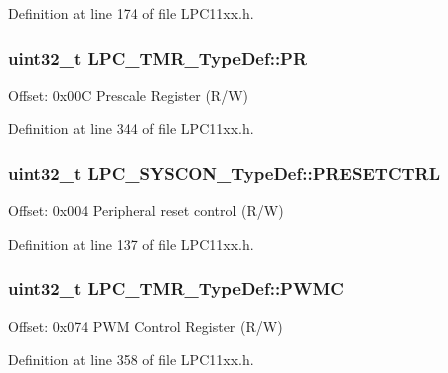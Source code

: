 Definition at line 174 of file L\+P\+C11xx.\+h.

\subsubsection[{\texorpdfstring{PR}{PR}}]{ uint32\+\_\+t L\+P\+C\+\_\+\+T\+M\+R\+\_\+\+Type\+Def\+::\+PR}\hypertarget{group___l_p_c11xx___definitions_gacda5f3b5ff58869fd5548ced27b32630}{}\label{group___l_p_c11xx___definitions_gacda5f3b5ff58869fd5548ced27b32630}
Offset\+: 0x00C Prescale Register (R/W) 

Definition at line 344 of file L\+P\+C11xx.\+h.

\subsubsection[{\texorpdfstring{P\+R\+E\+S\+E\+T\+C\+T\+RL}{PRESETCTRL}}]{ uint32\+\_\+t L\+P\+C\+\_\+\+S\+Y\+S\+C\+O\+N\+\_\+\+Type\+Def\+::\+P\+R\+E\+S\+E\+T\+C\+T\+RL}\hypertarget{group___l_p_c11xx___definitions_gaf1a4b05ee430bb29acff26d16d65448d}{}\label{group___l_p_c11xx___definitions_gaf1a4b05ee430bb29acff26d16d65448d}
Offset\+: 0x004 Peripheral reset control (R/W) 

Definition at line 137 of file L\+P\+C11xx.\+h.

\subsubsection[{\texorpdfstring{P\+W\+MC}{PWMC}}]{ uint32\+\_\+t L\+P\+C\+\_\+\+T\+M\+R\+\_\+\+Type\+Def\+::\+P\+W\+MC}\hypertarget{group___l_p_c11xx___definitions_ga26fca58bbc7cc65cdca1286221a3abc6}{}\label{group___l_p_c11xx___definitions_ga26fca58bbc7cc65cdca1286221a3abc6}
Offset\+: 0x074 P\+WM Control Register (R/W) 

Definition at line 358 of file L\+P\+C11xx.\+h.

